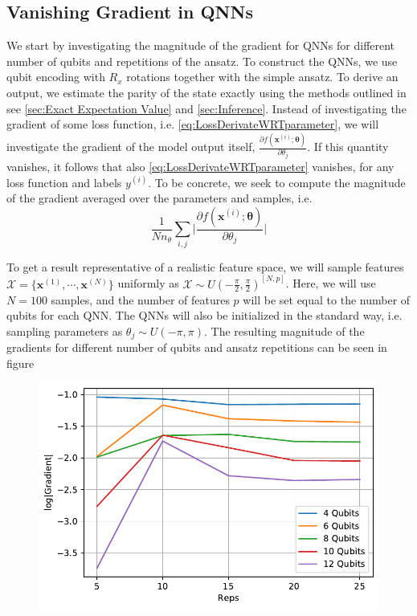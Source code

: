 \subsection{Vanishing Gradient in QNNs}\label{sec:Vanishing Gradient for QNNs}
We start by investigating the magnitude of the gradient for QNNs for different number of qubits and repetitions of the ansatz. To construct the QNNs, we use qubit encoding with $R_x$ rotations together with the simple ansatz. To derive an output, we estimate the parity of the state exactly using the methods outlined in see \autoref{sec:Exact Expectation Value} and \autoref{sec:Inference}. 
Instead of investigating the gradient of some loss function, i.e. \autoref{eq:LossDerivateWRTparameter}, we will investigate the gradient of the model output itself, $\frac{\partial f(\boldsymbol{x}^{(i)};\boldsymbol{\theta})}{\partial \theta_j}$. If this quantity vanishes, it follows that also \autoref{eq:LossDerivateWRTparameter} vanishes, for any loss function and labels $y^{(i)}$. To be concrete, we seek to compute the magnitude of the gradient averaged over the parameters and samples, i.e.
\begin{equation}
    \frac{1}{Nn_{\theta}}\sum_{i,j}\big|\frac{\partial f(\boldsymbol{x}^{(i)};\boldsymbol{\theta})}{\partial \theta_j}\big|
\end{equation}

To get a result representative of a realistic feature space, we will sample features $\mathcal{X} = \{\boldsymbol{x}^{(1)}, \cdots, \boldsymbol{x}^{(N)}\}$ uniformly as $\mathcal{X} \sim U(-\frac{\pi}{2}, \frac{\pi}{2})^{[N,p]}$. Here, we will use $N=100$ samples, and the number of features $p$ will be set equal to the number of qubits for each QNN. The QNNs will also be initialized in the standard way, i.e. sampling parameters as $\theta_j \sim U(-\pi, \pi)$. The resulting magnitude of the gradients for different number of qubits and ansatz repetitions can be seen in figure 

\begin{figure}[htp]
    \centering
    \includegraphics[width=12cm]{latex/figures/vanishing_gradient_QNN.pdf}
    \caption{}
    \label{fig:QNN_vanishing}
\end{figure}

